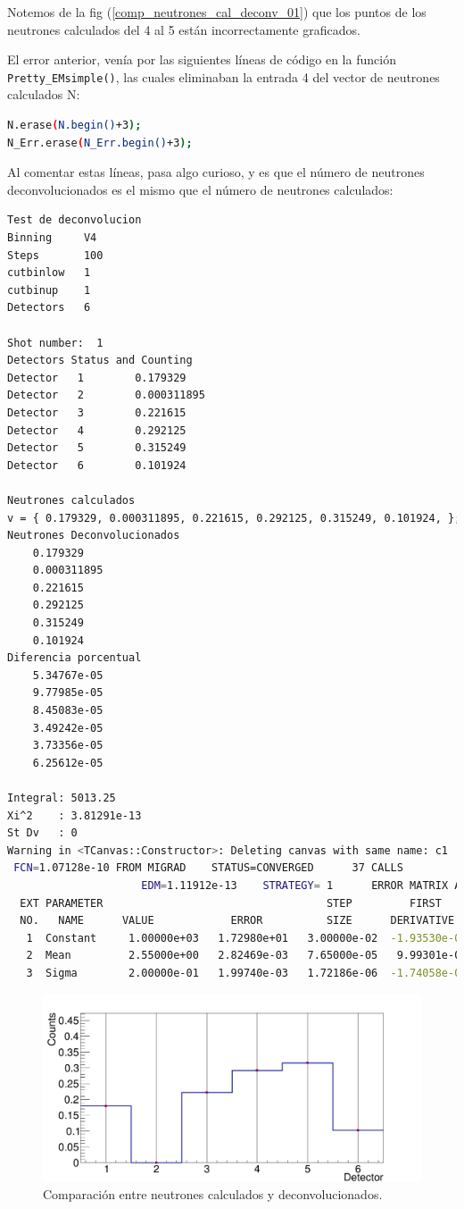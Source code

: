 \documentclass[11pt,letterpaper]{article}
\begin{document}
Notemos de la fig (\ref{comp_neutrones_cal_deconv_01}) que los puntos de los neutrones calculados del 4 al 5 están incorrectamente graficados.
	
El error anterior, venía por las siguientes líneas de código en la función  \verb|Pretty_EMsimple()|, las cuales eliminaban la entrada 4 del vector de neutrones calculados N:

\begin{lstlisting}[language=bash]
N.erase(N.begin()+3);
N_Err.erase(N_Err.begin()+3);
\end{lstlisting}

Al comentar estas líneas, pasa algo curioso, y es que el número de neutrones deconvolucionados es el mismo que el número de neutrones calculados:

\begin{lstlisting}[language=bash]
Test de deconvolucion
Binning		V4
Steps		100
cutbinlow	1
cutbinup	1
Detectors	6

Shot number:  1
Detectors Status and Counting
Detector   1		0.179329
Detector   2		0.000311895
Detector   3		0.221615
Detector   4		0.292125
Detector   5		0.315249
Detector   6		0.101924

Neutrones calculados	
v = { 0.179329, 0.000311895, 0.221615, 0.292125, 0.315249, 0.101924, }; 
Neutrones Deconvolucionados
	0.179329
	0.000311895
	0.221615
	0.292125
	0.315249
	0.101924
Diferencia porcentual
	5.34767e-05
	9.77985e-05
	8.45083e-05
	3.49242e-05
	3.73356e-05
	6.25612e-05

Integral: 5013.25
Xi^2	: 3.81291e-13
St Dv	: 0
Warning in <TCanvas::Constructor>: Deleting canvas with same name: c1
 FCN=1.07128e-10 FROM MIGRAD    STATUS=CONVERGED      37 CALLS          38 TOTAL
                     EDM=1.11912e-13    STRATEGY= 1      ERROR MATRIX ACCURATE 
  EXT PARAMETER                                   STEP         FIRST   
  NO.   NAME      VALUE            ERROR          SIZE      DERIVATIVE 
   1  Constant     1.00000e+03   1.72980e+01   3.00000e-02  -1.93530e-08
   2  Mean         2.55000e+00   2.82469e-03   7.65000e-05   9.99301e-09
   3  Sigma        2.00000e-01   1.99740e-03   1.72186e-06  -1.74058e-04
\end{lstlisting}


\begin{figure}[H]
\centering
    \includegraphics[width=1\textwidth]{img/EMsimple_Data_S1_02.png}
    \caption{Comparación entre neutrones calculados y deconvolucionados.}
    \label{comp_neutrones_cal_deconv_02}
\end{figure}
\end{document}
